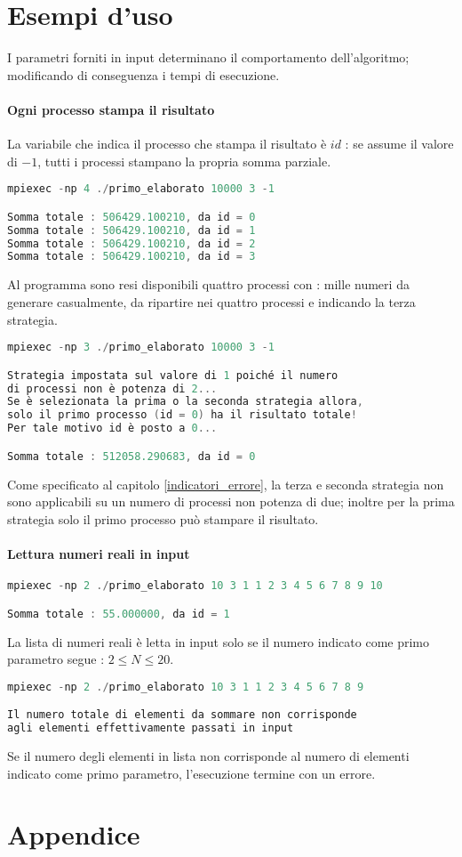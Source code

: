 \documentclass[a4paper,11pt]{book}
\begin{document}
\chapter{Esempi d'uso}
I parametri forniti in input determinano il comportamento dell'algoritmo; modificando di conseguenza i tempi di esecuzione. \par 
\subsubsection{Ogni processo stampa il risultato}
La variabile che indica il processo che stampa il risultato è $id$ : se assume il valore di $-1$, tutti i processi stampano la propria somma parziale.
\begin{lstlisting}[language=C]
mpiexec -np 4 ./primo_elaborato 10000 3 -1

Somma totale : 506429.100210, da id = 0
Somma totale : 506429.100210, da id = 1
Somma totale : 506429.100210, da id = 2
Somma totale : 506429.100210, da id = 3
\end{lstlisting}
Al programma sono resi disponibili quattro processi con : mille numeri da generare casualmente, da ripartire nei quattro processi e indicando la terza strategia.
\begin{lstlisting}[language=C]
mpiexec -np 3 ./primo_elaborato 10000 3 -1

Strategia impostata sul valore di 1 poiché il numero 
di processi non è potenza di 2...
Se è selezionata la prima o la seconda strategia allora,
solo il primo processo (id = 0) ha il risultato totale!
Per tale motivo id è posto a 0...

Somma totale : 512058.290683, da id = 0
\end{lstlisting}
Come specificato al capitolo \ref{indicatori_errore}, la terza e seconda strategia non sono applicabili su un numero di processi non potenza di due; inoltre per la prima strategia solo il primo processo può stampare il risultato.

\subsubsection{Lettura numeri reali in input}
\begin{lstlisting}[language=C]
mpiexec -np 2 ./primo_elaborato 10 3 1 1 2 3 4 5 6 7 8 9 10

Somma totale : 55.000000, da id = 1
\end{lstlisting}
La lista di numeri reali è letta in input solo se il numero indicato come primo parametro segue : $2 \leq N \leq 20$. 
\begin{lstlisting}[language=C]
mpiexec -np 2 ./primo_elaborato 10 3 1 1 2 3 4 5 6 7 8 9 

Il numero totale di elementi da sommare non corrisponde 
agli elementi effettivamente passati in input 
\end{lstlisting}
Se il numero degli elementi in lista non corrisponde al numero di elementi indicato come primo parametro, l'esecuzione termine con un errore.
\chapter{Appendice}
\end{document}

